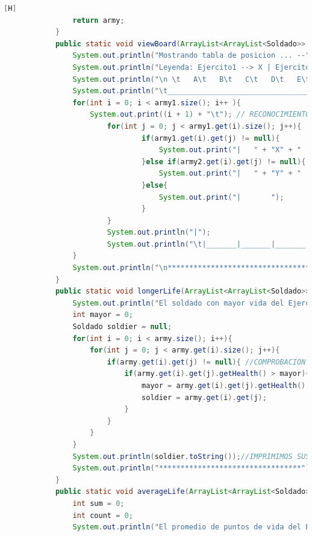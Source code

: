 \documentclass{article}
\begin{document}
\begin{lstlisting}[language=java,caption={Las lineas de codigo :}][H]
				return army;
			}
			public static void viewBoard(ArrayList<ArrayList<Soldado>> army1, ArrayList<ArrayList<Soldado>> army2){ //EN ESTE METODO NOS AYUDAMOS DEL ANTERIOR ARCHIVO YA QUE TENDRIAMOS UNA BASE PARA PODER CREARLO
				System.out.println("Mostrando tabla de posicion ... --");
				System.out.println("Leyenda: Ejercito1 --> X | Ejercito2 --> Y"); //RECONOCIMIENTO PARA LOS EJERCITOS Y POSICION DE SUS SOLDADOS
				System.out.println("\n \t   A\t   B\t   C\t   D\t   E\t   F\t   G\t   H\t   I\t   J"); // RECONOCIMIENTO PARA CADA UBICACION DE CADA SOLDADO EN EL TABLERO POR PARTE DE LAS COLUMNAS
				System.out.println("\t_________________________________________________________________________________");
				for(int i = 0; i < army1.size(); i++ ){
					System.out.print((i + 1) + "\t"); // RECONOCIMIENTO PARA CADA UBICACION DE CADA SOLDADO EN EL TABLERO POR PARTE DE LAS FILAS
						for(int j = 0; j < army1.get(i).size(); j++){
								if(army1.get(i).get(j) != null){
									System.out.print("|   " + "X" + "   "); //VERIFICANDOLA POSICIONES DE CADA SOLDADO DE CADA EJERCITO CON SU RESPECTIVO INDICADOR PARA PODER UBICARLOS
								}else if(army2.get(i).get(j) != null){
									System.out.print("|   " + "Y" + "   ");
								}else{
									System.out.print("|       ");
								}
						}
						System.out.println("|");
						System.out.println("\t|_______|_______|_______|_______|_______|_______|_______|_______|_______|_______|");
				}
				System.out.println("\n*********************************");
			}
			public static void longerLife(ArrayList<ArrayList<Soldado>> army, int num){
				System.out.println("El soldado con mayor vida del Ejercito " + num + " es: "); //METODO CREADO PARA PODER PERMITIRNOS A CONOCER EL SOLDADO CON MAYOR VIDA DE CADA EJERCITO 
				int mayor = 0;
				Soldado soldier = null;
				for(int i = 0; i < army.size(); i++){
					for(int j = 0; j < army.get(i).size(); j++){
						if(army.get(i).get(j) != null){ //COMPROBACION QUE HACEMOS PARA PODER DECIR QUE EL CASILLERO DONDE ESTAMOS ES UN SOLDADO QUE EXISTE
							if(army.get(i).get(j).getHealth() > mayor){ //COMPARAMOS PUNTOS DE VIDA DE CADA SOLDADO PARA VER QUIEN ES EL MAYOR 
								mayor = army.get(i).get(j).getHealth();
								soldier = army.get(i).get(j);
							}
						}
					}
				}
				System.out.println(soldier.toString());//IMPRIMIMOS SUS DATOS PARA PODER VER DE QUE SOLDADO SE TRATA 
				System.out.println("*********************************");
			}
			public static void averageLife(ArrayList<ArrayList<Soldado>> army, int num){
				int sum = 0;
				int count = 0;
				System.out.println("El promedio de puntos de vida del Ejercito " + num + " es: "); //METODO CREADO QUE NOS PERMITE DAR A CONOCER EL PROMEDIO DE VIDA DE CADA EJERCITO

\end{lstlisting}
\end{document}
